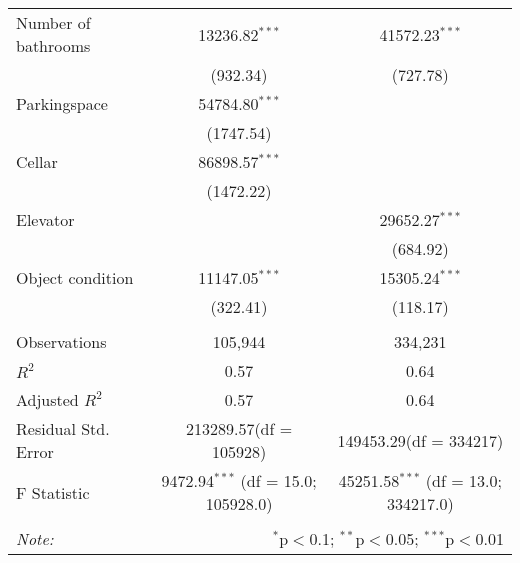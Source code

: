 \begin{table}[!htbp]
\begin{tabular}{@{\extracolsep{5pt}}lcc}
 Number of bathrooms & 13236.82$^{***}$ & 41572.23$^{***}$ \\
  & (932.34) & (727.78) \\
 Parkingspace & 54784.80$^{***}$ & \\
  & (1747.54) & \\
 Cellar & 86898.57$^{***}$ & \\
  & (1472.22) & \\
 Elevator & & 29652.27$^{***}$ \\
  & & (684.92) \\
 Object condition & 11147.05$^{***}$ & 15305.24$^{***}$ \\
  & (322.41) & (118.17) \\
\hline \\[-1.8ex]
 Observations & 105,944 & 334,231 \\
 $R^2$ & 0.57 & 0.64 \\
 Adjusted $R^2$ & 0.57 & 0.64 \\
 Residual Std. Error & 213289.57(df = 105928) & 149453.29(df = 334217)  \\
 F Statistic & 9472.94$^{***}$ (df = 15.0; 105928.0) & 45251.58$^{***}$ (df = 13.0; 334217.0) \\
\hline
\hline \\[-1.8ex]
\textit{Note:} & \multicolumn{2}{r}{$^{*}$p$<$0.1; $^{**}$p$<$0.05; $^{***}$p$<$0.01} \\
\end{tabular}
\end{table}